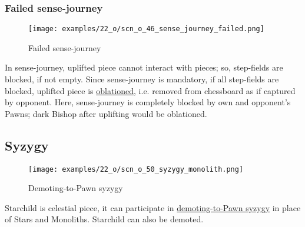 \clearpage %

\subsubsection*{Failed sense-journey}
\label{sec:One/Starchild/Sense-journey/Failed sense-journey}

\vspace*{-1.4\baselineskip}
\noindent
\begin{figure}[!h]
\texttt{[image: examples/22\_o/scn\_o\_46\_sense\_journey\_failed.png]}
\vspace*{-1.4\baselineskip}
\caption{Failed sense-journey}
\label{fig:scn_o_46_sense_journey_failed}
\end{figure}

\vspace*{-0.5\baselineskip}
In sense-journey, uplifted piece cannot interact with pieces; so, step-fields are
blocked, if not empty. Since sense-journey is mandatory, if all step-fields are
blocked, uplifted piece is \hyperref[sec:Terms/Oblation]{oblationed}, i.e. removed
from chessboard as if captured by opponent. \newline
\indent
Here, sense-journey is completely blocked by own and opponent's Pawns; dark Bishop
after uplifting would be oblationed.

\clearpage %

\subsection*{Syzygy}
\label{sec:One/Starchild/Syzygy}

\vspace*{-1.4\baselineskip}
\noindent
\begin{figure}[!h]
\texttt{[image: examples/22\_o/scn\_o\_50\_syzygy\_monolith.png]}
\caption{Demoting-to-Pawn syzygy}
\label{fig:scn_o_50_syzygy_monolith}
\end{figure}

Starchild is celestial piece, it can participate in
\hyperref[fig:scn_d_22_syzygy_2_stars_init]{demoting-to-Pawn syzygy} in place of
Stars and Monoliths. Starchild can also be demoted.

